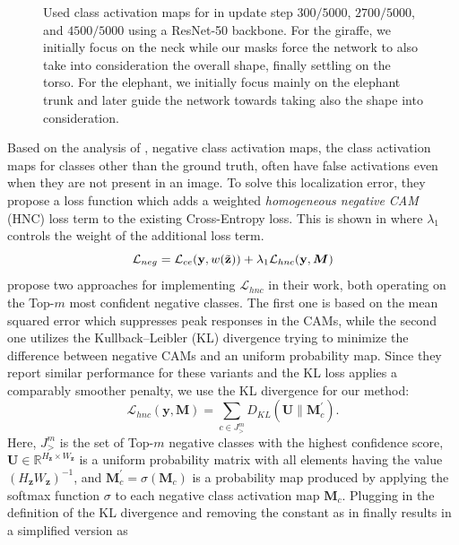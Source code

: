 \begin{figure}[t]
\begin{tabularx}{\textwidth}{lYYYY}
    \end{tabularx}
    \caption[Used class activation maps in \divcams throughout training]{Used class activation maps for \divcams in update step $300/5000$, $2700/5000$, and $4500/5000$ using a ResNet-50 backbone. For the giraffe, we initially focus on the neck while our masks force the network to also take into consideration the overall shape, finally settling on the torso. For the elephant, we initially focus mainly on the elephant trunk and later guide the network towards taking also the shape into consideration.}
    \label{fig:cams_and_masks_divcam}
\end{figure}

Based on the analysis of \citet{sun2020fixing}, negative class activation maps, \ie the class activation maps for classes other than the ground truth, often have false activations even when they are not present in an image. To solve this localization error, they propose a loss function which adds a weighted \emph{homogeneous negative CAM} (HNC) loss term to the existing Cross-Entropy loss. This is shown in  where $\lambda_1$ controls the weight of the additional loss term. 
\begin{equation}
\label{eq:hnc}
\mathcal{L}_{neg} =\mathcal{L}_{ce}(\mathbf{y}, w(\Tilde{\mathbf{z}}))+\lambda_1 \mathcal{L}_{hnc}(\mathbf{y}, \boldsymbol{M})
\end{equation}
\citet{sun2020fixing} propose two approaches for implementing $\mathcal{L}_{hnc}$ in their work, both operating on the Top-$m$ most confident negative classes. The first one is based on the mean squared error which suppresses peak responses in the CAMs, while the second one utilizes the Kullback–Leibler (KL) divergence trying to minimize the difference between negative CAMs and an uniform probability map. Since they report similar performance for these variants and the KL loss applies a comparably smoother penalty, we use the KL divergence for our method:
\begin{equation}
\label{eq:hnc-kl}
\mathcal{L}_{hnc}(\mathbf{y}, \boldsymbol{M})=\sum_{c \in J^{m}_>} D_{K L}\left(\boldsymbol{U} \| \boldsymbol{M}_{c}^{\prime}\right).
\end{equation}
Here, $J^{m}_>$ is the set of Top-$m$ negative classes with the highest confidence score, $\boldsymbol{U} \in \mathbb{R}^{H_\mathbf{z} \times W_\mathbf{z}}$ is a uniform probability matrix with all elements having the value $(H_\mathbf{z}W_\mathbf{z})^{-1}$, and $\boldsymbol{M}_{c}^{\prime} = \sigma(\boldsymbol{M}_{c})$ is a probability map produced by applying the softmax function $\sigma$ to each negative class activation map $\boldsymbol{M}_{c}$. Plugging in the definition of the KL divergence and removing the constant as in  finally results in a simplified version as
